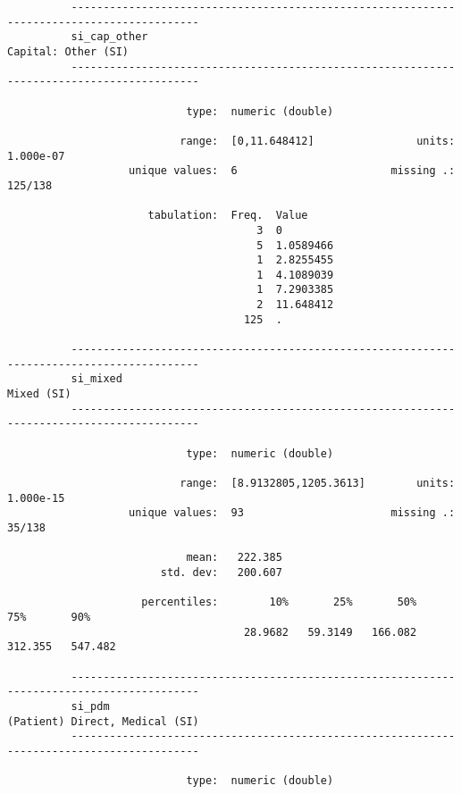 \documentclass{article}
\begin{document}
\begin{verbatim}
          ------------------------------------------------------------------------------------------
          si_cap_other                                                           Capital: Other (SI)
          ------------------------------------------------------------------------------------------
          
                            type:  numeric (double)
          
                           range:  [0,11.648412]                units:  1.000e-07
                   unique values:  6                        missing .:  125/138
          
                      tabulation:  Freq.  Value
                                       3  0
                                       5  1.0589466
                                       1  2.8255455
                                       1  4.1089039
                                       1  7.2903385
                                       2  11.648412
                                     125  .
          
          ------------------------------------------------------------------------------------------
          si_mixed                                                                        Mixed (SI)
          ------------------------------------------------------------------------------------------
          
                            type:  numeric (double)
          
                           range:  [8.9132805,1205.3613]        units:  1.000e-15
                   unique values:  93                       missing .:  35/138
          
                            mean:   222.385
                        std. dev:   200.607
          
                     percentiles:        10%       25%       50%       75%       90%
                                     28.9682   59.3149   166.082   312.355   547.482
          
          ------------------------------------------------------------------------------------------
          si_pdm                                                      (Patient) Direct, Medical (SI)
          ------------------------------------------------------------------------------------------
          
                            type:  numeric (double)
          

\end{verbatim}
\end{document}
